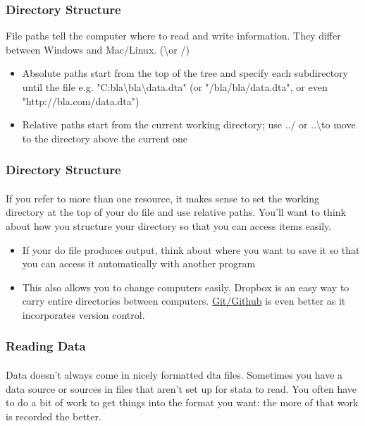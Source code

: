 \documentclass{beamer}
\begin{document}
\begin{frame}
  \frametitle{Directory Structure}
  File paths tell the computer where to read and write information. They differ between Windows and Mac/Linux. (\textbackslash or /)
  \begin{itemize}
    \item Absolute paths start from the top of the tree and specify each subdirectory until the file e.g. "C:bla\textbackslash bla\textbackslash data.dta" (or "/bla/bla/data.dta", or even "http://bla.com/data.dta")
    \item Relative paths start from the current working directory; use ../ or ..\textbackslash to move to the directory above the current one
  \end{itemize}
\end{frame}

\begin{frame}
  \frametitle{Directory Structure}
  \framesubtitle{}
  If you refer to more than one resource, it makes sense to set the working directory at the top of your do file and use relative paths. You'll want to think about how you structure your directory so that you can access items easily.
  \begin{itemize}
    \item If your do file produces output, think about where you want to save it so that you can access it automatically with another program
    \item This also allows you to change computers easily. Dropbox is an easy way to carry entire directories between computers. \href{https://desktop.github.com/}{Git/Github} is even better as it incorporates version control.
  \end{itemize}
\end{frame}

\begin{frame}
  \frametitle{Reading Data}
  \framesubtitle{}
Data doesn't always come in nicely formatted dta files. Sometimes you have a data source or sources in files that aren't set up for stata to read. You often have to do a bit of work to get things into the format you want: the more of that work is recorded the better.


\end{frame}
\end{document}
